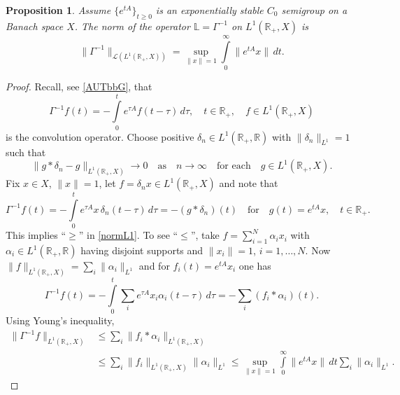 \documentclass[10pt,psamsfonts,leqno]{siamltex}
\newtheorem{prop}{Proposition}[section]
\begin{document}
\begin{prop}\label{normonL1} Assume $\{e^{tA}\}_{t\ge0}$ is an
exponentially stable $C_0$ semigroup on a Banach space $X$.
The norm of the
operator ${\mathbb L}=\Gamma^{-1}$ on $L^1({\mathbb R}_+,X)$ is
\begin{equation}\label{normL1}
\|\Gamma^{-1}\|_{{\mathcal L}(L^1({\mathbb R}_+,X))}=
\sup_{\|x\|=1}\int\limits_0^\infty\|e^{tA}x\|\,dt.
\end{equation}
\end{prop}
\begin{proof}
Recall, see \eqref{AUTbbG}, that
\[\Gamma^{-1}f(t)=-\int\limits_0^t e^{\tau A}f(t-\tau)\,d\tau,
\quad t\in{\mathbb R}_+,\quad f\in L^1({\mathbb R}_+,X)\]
is the convolution operator. Choose positive
$\delta_n\in L^1({\mathbb R}_+,{\mathbb R})$ with
$\|\delta_n\|_{L^1}=1$ such that
\[
\|g*\delta_n-g\|_{L^1({\mathbb R}_+,X)}\to 0\quad\text{as}
\quad n\to\infty \quad\text{for each}\quad g\in L^1({\mathbb R}_+,X).
\]
Fix $x\in X$, $\|x\|=1$,
let $f=\delta_n x\in L^1({\mathbb R}_+,X)$ and note that
\[
\Gamma^{-1}f(t)=-\int\limits_0^te^{\tau A}x\,\delta_n(t-\tau)\,d\tau=
-(g*\delta_n)(t)\quad\text{for}\quad g(t)=e^{tA}x,\quad t\in{\mathbb
R}_+.
\]
This implies ``$\ge$'' in \eqref{normL1}. To see ``$\le$'', take
$f=\sum_{i=1}^N\alpha_i x_i$ with $\alpha_i\in L^1({\mathbb
R}_+,{\mathbb R})$ having disjoint supports and $\|x_i\|=1$,
$i=1,\ldots,N$.
Now $\|f\|_{L^1({\mathbb R}_+,X)}=\sum_i\|\alpha_i\|_{L^1}$ and for
$f_i(t)=e^{tA}x_i$ one has
\[\Gamma^{-1}f(t)=-\int\limits_0^t\sum_i e^{\tau
A}x_i\alpha_i(t-\tau)\,d\tau=-\sum_i(f_i*\alpha_i)(t).
\]
Using Young's inequality,
$$ \begin{aligned}
   \|\Gamma^{-1}f\|_{L^1({\mathbb R}_+,X)}
   &\le
   \sum_i\|f_i*\alpha_i\|_{L^1({\mathbb R}_+,X)}\\
   &\le
   \sum_i\|f_i\|_{L^1({\mathbb R}_+,X)}\|\alpha_i\|_{L^1} \le
\sup_{\|x\|=1}\int\limits_0^\infty\|e^{tA}x\|\,dt\sum_i\|\alpha_i\|_{L^1}.
\end{aligned}
$$
\end{proof}
\end{document}
